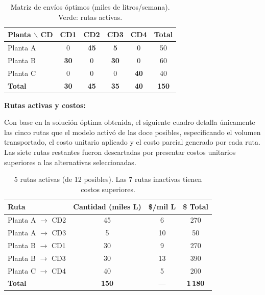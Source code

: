 \documentclass[12pt,a4paper]{article}
\begin{document}
\begin{table}[H]
  \centering
  \begin{tabular}{|l|c|c|c|c|c|}
    \hline
    \rowcolor{azulClaro}
    \textbf{Planta $\backslash$ CD} & \textbf{CD1} & \textbf{CD2} & \textbf{CD3} & \textbf{CD4} & \textbf{Total} \\
    \hline
    Planta A & 0  & \cellcolor{verdeCritico}\textbf{45} & \cellcolor{verdeCritico}\textbf{5}  & 0  & 50 \\
    \hline
    Planta B & \cellcolor{verdeCritico}\textbf{30} & 0  & \cellcolor{verdeCritico}\textbf{30} & 0  & 60 \\
    \hline
    Planta C & 0  & 0  & 0  & \cellcolor{verdeCritico}\textbf{40} & 40 \\
    \hline
    \rowcolor{grisTabla}
    \textbf{Total} & \textbf{30} & \textbf{45} & \textbf{35} & \textbf{40} & \textbf{150} \\
    \hline
  \end{tabular}
  \caption{Matriz de env\'{i}os \'{o}ptimos (miles de litros/semana). Verde: rutas activas.}
\end{table}

\noindent\textbf{Rutas activas y costos:}

Con base en la soluci\'{o}n \'{o}ptima obtenida, el siguiente cuadro detalla \'{u}nicamente 
las cinco rutas que el modelo activ\'{o} de las doce posibles, especificando el volumen 
transportado, el costo unitario aplicado y el costo parcial generado por cada ruta. 
Las siete rutas restantes fueron descartadas por presentar costos unitarios superiores a 
las alternativas seleccionadas.

\begin{table}[H]
  \centering
  \begin{tabular}{|l|c|c|c|}
    \hline
    \rowcolor{azulClaro}
    \textbf{Ruta} & \textbf{Cantidad (miles L)} & \textbf{\$/mil L} & \textbf{\$ Total} \\
    \hline
    Planta A $\to$ CD2 & 45 & 6  & 270 \\
    Planta A $\to$ CD3 & 5  & 10 & 50  \\
    Planta B $\to$ CD1 & 30 & 9  & 270 \\
    Planta B $\to$ CD3 & 30 & 13 & 390 \\
    Planta C $\to$ CD4 & 40 & 5  & 200 \\
    \hline
    \rowcolor{grisTabla}
    \textbf{Total} & \textbf{150} & --- & \textbf{1\,180} \\
    \hline
  \end{tabular}
  \caption{5 rutas activas (de 12 posibles). Las 7 rutas inactivas tienen costos superiores.}
\end{table}
\end{document}

